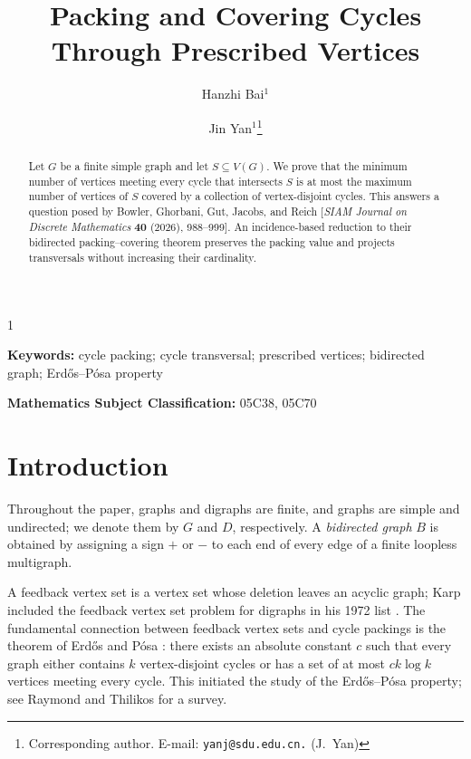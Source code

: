 \documentclass[a4paper,11pt]{article}
\theoremstyle{plain}
\theoremstyle{definition}
\theoremstyle{remark}
\begin{document}
	\date{}
	\begin{spacing}{1}

\title{Packing and Covering Cycles Through Prescribed Vertices}

\author{
Hanzhi Bai$^{1}$\and
Jin Yan$^{1}$\thanks{Corresponding author. E-mail: {\tt yanj@sdu.edu.cn.} (J.~Yan)
}}

\maketitle

\begin{abstract}
Let $G$ be a finite simple graph and let $S\subseteq V(G)$.
We prove that the minimum number of vertices meeting every cycle that
intersects $S$ is at most the maximum number of vertices of $S$ covered by a
collection of vertex-disjoint cycles.  This answers a question posed by Bowler,
Ghorbani, Gut, Jacobs, and Reich [\emph{SIAM Journal on Discrete Mathematics}
\textbf{40} (2026), 988--999].  An incidence-based reduction to their
bidirected packing--covering theorem preserves the packing value and projects
transversals without increasing their cardinality.
\end{abstract}

\noindent\textbf{Keywords:} cycle packing; cycle transversal; prescribed
vertices; bidirected graph; Erd\H{o}s--P\'osa property

\noindent\textbf{Mathematics Subject Classification:} 05C38, 05C70

\section{Introduction}

Throughout the paper, graphs and digraphs are finite, and graphs are simple
and undirected; we denote them by $G$ and $D$, respectively.  A
\emph{bidirected graph} $B$ is obtained by assigning a sign $+$ or $-$ to each
end of every edge of a finite loopless multigraph.

A feedback vertex set is a vertex set whose deletion leaves an acyclic graph;
Karp included the feedback vertex set problem for digraphs in his 1972 list
\cite{Karp1972}.  The
fundamental connection between feedback vertex sets and cycle packings is the
theorem of Erd\H{o}s and P\'osa
\cite{ErdosPosa1965}: there exists an absolute constant $c$ such that every
graph either contains $k$ vertex-disjoint cycles or has a set of at most
$ck\log k$ vertices meeting every cycle.  This initiated the study of the
Erd\H{o}s--P\'osa property; see Raymond and Thilikos
\cite{RaymondThilikos2017} for a survey.


\end{spacing}
\end{document}
